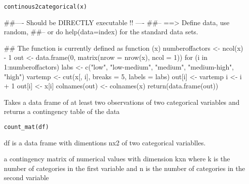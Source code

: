 \documentclass[letterpaper]{book}
\begin{document}
%
\begin{Usage}
\begin{verbatim}
continous2categorical(x)
\end{verbatim}
\end{Usage}
%
\begin{Arguments}
\begin{ldescription}
\item[\code{x}] 


\end{ldescription}
\end{Arguments}
%
\begin{Examples}
\begin{ExampleCode}
##---- Should be DIRECTLY executable !! ----
##-- ==>  Define data, use random,
##--	or do  help(data=index)  for the standard data sets.

## The function is currently defined as
function (x) 
{
    numberoffactors <- ncol(x) - 1
    out <- data.frame(0, matrix(nrow = nrow(x), ncol = 1))
    for (i in 1:numberoffactors) {
        labs <- c("low", "low-medium", "medium", "medium-high", 
            "high")
        vartemp <- cut(x[, i], breaks = 5, labels = labs)
        out[i] <- vartemp
    }
    i <- i + 1
    out[i] <- x[i]
    colnames(out) <- colnames(x)
    return(data.frame(out))
  }
\end{ExampleCode}
\end{Examples}
%
\begin{Description}\relax
Takes a data frame of at least two observations of two categorical variables 
and returns a contingency table of the data 
\end{Description}
%
\begin{Usage}
\begin{verbatim}
count_mat(df)
\end{verbatim}
\end{Usage}
%
\begin{Arguments}
\begin{ldescription}
\item[\code{df}] 
df is a data frame with dimentions nx2 of two categorical variablles. 

\end{ldescription}
\end{Arguments}
%
\begin{Value}
\begin{ldescription}
\item[\code{m}] a contingency matrix of numerical values with dimension kxn where k is the number of categories in the first variable and n is the number of categories in the second variable   
\end{ldescription}





\end{Value}
\end{document}
